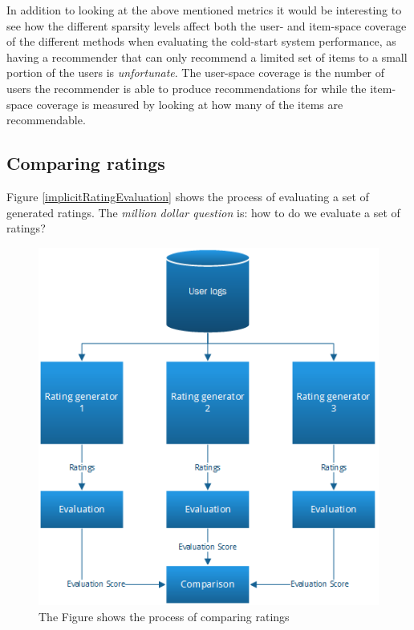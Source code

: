 

In addition to looking at the above mentioned metrics it would be interesting to see how
the different sparsity levels affect both the user- and item-space coverage of the different
methods when evaluating the cold-start system performance, as having a recommender that can only
recommend a limited set of items to a small portion of the users is \emph{unfortunate}. The
user-space coverage is the number of users the recommender is able to produce recommendations for while the item-space
coverage is measured by looking at how many of the items are recommendable.


\subsection{Comparing ratings}

Figure \ref{implicitRatingEvaluation} shows the process of evaluating a set of generated ratings. The \emph{million dollar question} is: how to do we evaluate a set of ratings?

\begin{figure}[H]
		\centering
	  	\includegraphics[height=0.65\linewidth]{image/ratinggeneval.png}
		\caption[Comparing Ratings]{The Figure shows the process of comparing ratings}
		\label{figure:compareratings}
\end{figure}

